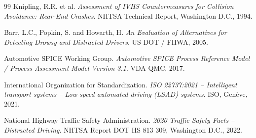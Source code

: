 \documentclass[12pt,a4paper]{report}
\begin{document}
\begin{thebibliography}{99}
Knipling, R.R. et al.
\textit{Assessment of IVHS Countermeasures for Collision Avoidance: Rear-End Crashes}.
NHTSA Technical Report, Washington D.C., 1994.

Barr, L.C., Popkin, S. and Howarth, H.
\textit{An Evaluation of Alternatives for Detecting Drowsy and Distracted Drivers}.
US DOT / FHWA, 2005.

Automotive SPICE Working Group.
\textit{Automotive SPICE Process Reference Model / Process Assessment Model Version 3.1}.
VDA QMC, 2017.

International Organization for Standardization.
\textit{ISO 22737:2021 -- Intelligent transport systems -- Low-speed automated driving (LSAD) systems}.
ISO, Gen\`eve, 2021.

National Highway Traffic Safety Administration.
\textit{2020 Traffic Safety Facts -- Distracted Driving}.
NHTSA Report DOT HS 813 309, Washington D.C., 2022.

\end{thebibliography}

\clearpage

\printindex
\end{document}
